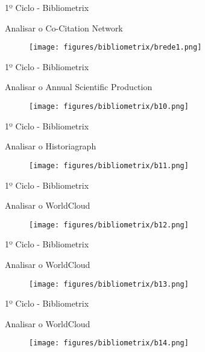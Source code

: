 \begin{frame}{1º Ciclo - Bibliometrix}

	Analisar o Co-Citation Network
	
	\begin{figure}[hb]
		\centering
		\texttt{[image: figures/bibliometrix/brede1.png]}
	\end{figure}
	
\end{frame}

\begin{frame}{1º Ciclo - Bibliometrix}

	Analisar o Annual Scientific Production
	
	\begin{figure}[hb]
		\centering
		\texttt{[image: figures/bibliometrix/b10.png]}
	\end{figure}
	
\end{frame}

\begin{frame}{1º Ciclo - Bibliometrix}

	Analisar o Historiagraph
	
	\begin{figure}[hb]
		\centering
		\texttt{[image: figures/bibliometrix/b11.png]}
	\end{figure}
	
\end{frame}

\begin{frame}{1º Ciclo - Bibliometrix}

	Analisar o WorldCloud
	
	\begin{figure}[hb]
		\centering
		\texttt{[image: figures/bibliometrix/b12.png]}
	\end{figure}
	
\end{frame}

\begin{frame}{1º Ciclo - Bibliometrix}

	Analisar o WorldCloud
	\begin{figure}[hb]
		\centering
		\texttt{[image: figures/bibliometrix/b13.png]}
	\end{figure}
	
\end{frame}

\begin{frame}{1º Ciclo - Bibliometrix}

	Analisar o WorldCloud
	\begin{figure}[hb]
		\centering
		\texttt{[image: figures/bibliometrix/b14.png]}
	\end{figure}
	
\end{frame}

